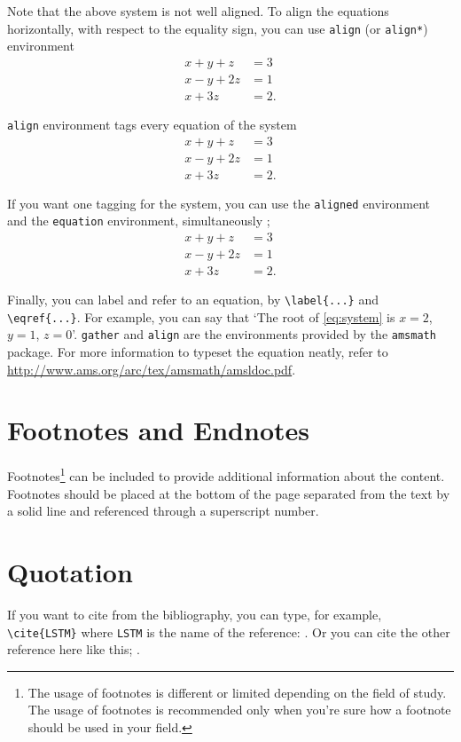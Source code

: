 Note that the above system is not well aligned.
To align the equations horizontally, with respect to the equality sign, you can use \texttt{align} (or \texttt{align*}) environment
\begin{align*}
x+y+z&=3\\
x-y+2z&=1\\
x+3z&=2.
\end{align*}

\texttt{align} environment tags every equation of the system
\begin{align}
x+y+z&=3\\
x-y+2z&=1\\
x+3z&=2.
\end{align}

If you want one tagging for the system, you can use the \texttt{aligned} environment and the \texttt{equation} environment, simultaneously ;
\begin{equation}\label{eq:system}
\begin{aligned}
x+y+z&=3\\
x-y+2z&=1\\
x+3z&=2.
\end{aligned}
\end{equation}

Finally, you can label and refer to an equation, by \verb|\label{...}| and \verb|\eqref{...}|.
For example, you can say that `The root of \eqref{eq:system} is \(x=2\), \(y=1\), \(z=0\)'.
\texttt{gather} and \texttt{align} are the environments provided by the \texttt{amsmath} package.
For more information to typeset the equation neatly, refer to \url{http://www.ams.org/arc/tex/amsmath/amsldoc.pdf}.


\section{Footnotes and Endnotes}\label{sec:footnotes_endnotes}

Footnotes\footnote{The usage of footnotes is different or limited depending on the field of study. The usage of footnotes is recommended only when you’re sure how a footnote should be used in your field.} can be included to provide additional information about the content. Footnotes should be placed at the bottom of the page separated from the text by a solid line and referenced through a superscript number.



\section{Quotation}
If you want to cite from the bibliography, you can type, for example, \verb|\cite{LSTM}| where \texttt{LSTM} is the name of the reference: \cite{LSTM}.
Or you can cite the other reference here like this; \cite{pure}.


